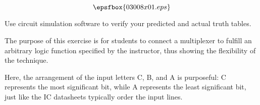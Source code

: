 

$$\epsfbox{03008x01.eps}$$

\vfil \eject






Use circuit simulation software to verify your predicted and actual truth tables.







The purpose of this exercise is for students to connect a multiplexer to fulfill an arbitrary logic function specified by the instructor, thus showing the flexibility of the technique.

Here, the arrangement of the input letters C, B, and A is purposeful: C represents the most significant bit, while A represents the least significant bit, just like the IC datasheets typically order the input lines.




